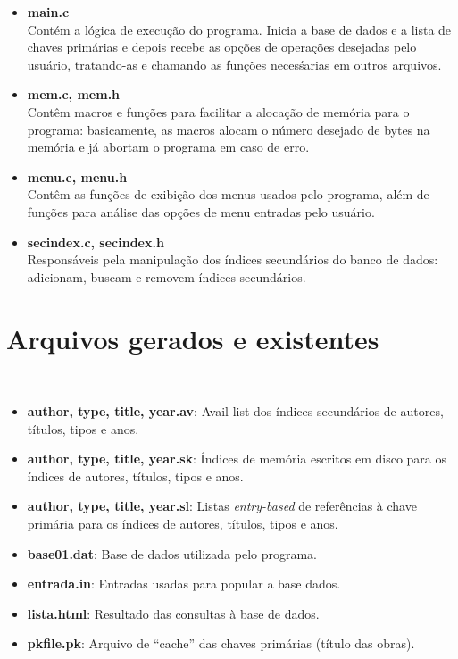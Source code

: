 \documentclass{article}
\begin{document}
\begin{itemize}
 \item \textbf{main.c}\\
	Contém a lógica de execução do programa. Inicia a base de dados e a lista de chaves primárias e depois recebe as opções de operações desejadas pelo usuário, tratando-as e chamando as funções necesśarias em outros arquivos.

 \item \textbf{mem.c, mem.h}\\
	Contêm macros e funções para facilitar a alocação de memória para o programa: basicamente, as macros alocam o número desejado de bytes na memória e já abortam o programa em caso de erro.
	
 \item \textbf{menu.c, menu.h}\\
	Contêm as funções de exibição dos menus usados pelo programa, além de funções para análise das opções de menu entradas pelo usuário.

 \item \textbf{secindex.c, secindex.h}\\
	Responsáveis pela manipulação dos índices secundários do banco de dados: adicionam, buscam e removem índices secundários.
\end{itemize}

\section{Arquivos gerados e existentes}\

\begin{itemize}
 \item \textbf{author, type, title, year.av}: Avail list dos índices secundários de autores, títulos, tipos e anos.
 \item \textbf{author, type, title, year.sk}: Índices de memória escritos em disco para os índices de autores, títulos, tipos e anos.
 \item \textbf{author, type, title, year.sl}: Listas \textit{entry-based} de referências à chave primária para os índices de autores, títulos, tipos e anos.
 \item \textbf{base01.dat}: Base de dados utilizada pelo programa.
 \item \textbf{entrada.in}: Entradas usadas para popular a base dados.
 \item \textbf{lista.html}: Resultado das consultas à base de dados.
 \item \textbf{pkfile.pk}: Arquivo de ``cache'' das chaves primárias (título das obras).
\end{itemize}
\end{document}
